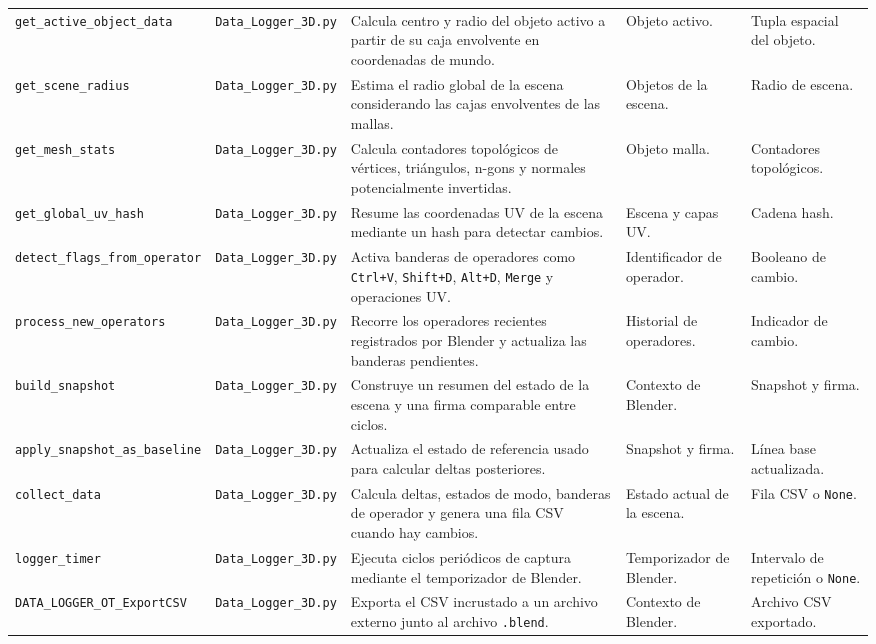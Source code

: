 {\begin{landscape}
\begin{longtable}{p{4.7cm}p{3.2cm}p{8.5cm}p{3.8cm}p{3.8cm}}
\texttt{get\_active\_object\_data} & \texttt{Data\_Logger\_3D.py} & Calcula centro y radio del objeto activo a partir de su caja envolvente en coordenadas de mundo. & Objeto activo. & Tupla espacial del objeto. \\
\texttt{get\_scene\_radius} & \texttt{Data\_Logger\_3D.py} & Estima el radio global de la escena considerando las cajas envolventes de las mallas. & Objetos de la escena. & Radio de escena. \\
\texttt{get\_mesh\_stats} & \texttt{Data\_Logger\_3D.py} & Calcula contadores topológicos de vértices, triángulos, n-gons y normales potencialmente invertidas. & Objeto malla. & Contadores topológicos. \\
\texttt{get\_global\_uv\_hash} & \texttt{Data\_Logger\_3D.py} & Resume las coordenadas UV de la escena mediante un hash para detectar cambios. & Escena y capas UV. & Cadena hash. \\
\texttt{detect\_flags\_from\_operator} & \texttt{Data\_Logger\_3D.py} & Activa banderas de operadores como \texttt{Ctrl+V}, \texttt{Shift+D}, \texttt{Alt+D}, \texttt{Merge} y operaciones UV. & Identificador de operador. & Booleano de cambio. \\
\texttt{process\_new\_operators} & \texttt{Data\_Logger\_3D.py} & Recorre los operadores recientes registrados por Blender y actualiza las banderas pendientes. & Historial de operadores. & Indicador de cambio. \\
\texttt{build\_snapshot} & \texttt{Data\_Logger\_3D.py} & Construye un resumen del estado de la escena y una firma comparable entre ciclos. & Contexto de Blender. & Snapshot y firma. \\
\texttt{apply\_snapshot\_as\_baseline} & \texttt{Data\_Logger\_3D.py} & Actualiza el estado de referencia usado para calcular deltas posteriores. & Snapshot y firma. & Línea base actualizada. \\
\texttt{collect\_data} & \texttt{Data\_Logger\_3D.py} & Calcula deltas, estados de modo, banderas de operador y genera una fila CSV cuando hay cambios. & Estado actual de la escena. & Fila CSV o \texttt{None}. \\
\texttt{logger\_timer} & \texttt{Data\_Logger\_3D.py} & Ejecuta ciclos periódicos de captura mediante el temporizador de Blender. & Temporizador de Blender. & Intervalo de repetición o \texttt{None}. \\
\texttt{DATA\_LOGGER\_OT\_ExportCSV} & \texttt{Data\_Logger\_3D.py} & Exporta el CSV incrustado a un archivo externo junto al archivo \texttt{.blend}. & Contexto de Blender. & Archivo CSV exportado. \\

\end{longtable}
\end{landscape}}
